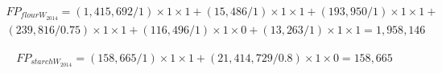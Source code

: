 \documentclass[]{article}
\begin{document}
\begin{equation}
\begin{multlined}
\label{eq:flourFP}
FP_{flourW_{2014}} = \left(1,415,692/1\right)\times 1\times 1 +\left(15,486/1\right)\times 1\times 1 
+\left(193,950/1\right)\times 1\times 1
+\\
\left(239,816/0.75\right)\times 1\times 1 +
\left(116,496/1\right)\times 1\times 0 +\left(13,263/1\right)\times 1\times 1= 1,958,146
\end{multlined}
\end{equation}

\begin{equation}
\begin{multlined}
\label{eq:starchFP}
FP_{starchW_{2014}} = \left(158,665/1\right)\times 1\times 1 +\left(21,414,729/0.8\right)\times 1\times 0 = 158,665
\end{multlined}
\end{equation}
\end{document}
